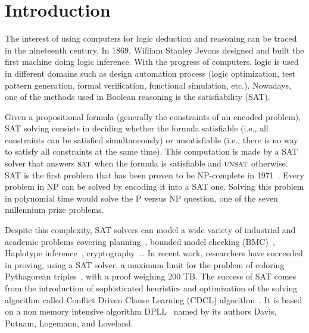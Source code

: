 \chapter{Introduction}\label{chap:intro}

The interest of using computers for logic deduction and reasoning can be traced in the nineteenth century.
In 1869,  William Stanley Jevons designed and built the first machine doing logic inference.
With the progress of computers, logic is used in different domains such as design automation process 
(logic optimization, test pattern generation, formal verification, functional simulation, etc.).
Nowadays, one of the methods used in Boolean reasoning is the  satisfiability (SAT).

Given a propositional formula (generally the constraints of an encoded problem),
SAT solving consists in deciding whether the formula  satisfiable (i.e., all constraints can be
satisfied simultaneously) or unsatisfiable (i.e., there is no way to satisfy all constraints at the same time).
This computation is made by a SAT solver that answers $\textsc{sat}$ when the formula is satisfiable
and $\textsc{unsat}$ otherwise.
SAT is the first problem that has been proven to be NP-complete in 1971~\cite{cook1971complexity}. 
Every problem in NP can be solved by encoding it into a SAT one. Solving this problem in 
polynomial time would solve the P versus NP question, one of the seven millennium prize problems.


Despite this complexity, SAT solvers can model a wide variety of industrial and academic problems
covering planning~\cite{planning_92}, bounded model checking (BMC)~\cite{bmc_99}, Haplotype inference~\cite{biology_06}, cryptography~\cite{crypto_00}\ldots
In recent work, researchers have succeeded in proving, using a SAT solver, a maximum limit
for the problem of coloring Pythagorean triples~\cite{heule2016solving}, with a proof weighing 200 TB.
The success of SAT comes from the introduction of sophisticated heuristics and optimization of the solving 
algorithm called Conflict Driven Clause Learning (CDCL) algorithm~\cite{marques1999grasp}.
 It is based on a non memory intensive algorithm DPLL~\cite{dpll_62} named by its authors Davis, Putnam, Logemann, and Loveland.

